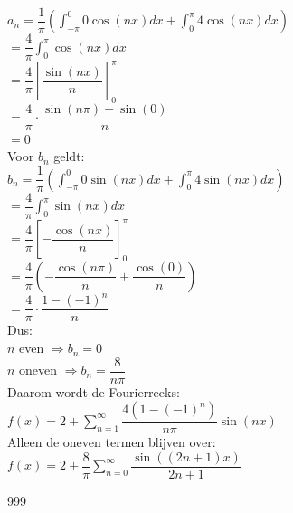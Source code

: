 \documentclass[a4paper]{article}
\newcommand{\dint}{\displaystyle\int}
\begin{document}
$ a_n=\dfrac{1}{\pi}\left(\dint_{-\pi}^{0}0\cos(nx)dx+\dint_{0}^{\pi}4\cos(nx)dx\right) $ \\

$ =\dfrac{4}{\pi}\dint_{0}^{\pi}\cos(nx)dx $ \\

$ =\dfrac{4}{\pi}\left[\dfrac{\sin(nx)}{n}\right]_{0}^{\pi} $ \\

$ =\dfrac{4}{\pi}\cdot\dfrac{\sin(n\pi)-\sin(0)}{n} $ \\

$ =0 $ \\

Voor $b_n$ geldt: \\

$ b_n=\dfrac{1}{\pi}\left(\dint_{-\pi}^{0}0\sin(nx)dx+\dint_{0}^{\pi}4\sin(nx)dx\right) $ \\

$ =\dfrac{4}{\pi}\dint_{0}^{\pi}\sin(nx)dx $ \\

$ =\dfrac{4}{\pi}\left[-\dfrac{\cos(nx)}{n}\right]_{0}^{\pi} $ \\

$ =\dfrac{4}{\pi}\left(-\dfrac{\cos(n\pi)}{n}+\dfrac{\cos(0)}{n}\right) $ \\

$ =\dfrac{4}{\pi}\cdot\dfrac{1-(-1)^n}{n} $ \\

Dus: \\

$ n $ even $ \Rightarrow b_n=0 $ \\

$ n $ oneven $ \Rightarrow b_n=\dfrac{8}{n\pi} $ \\

Daarom wordt de Fourierreeks: \\

$ f(x)=2+\displaystyle\sum_{n=1}^{\infty}\dfrac{4(1-(-1)^n)}{n\pi}\sin(nx) $ \\

Alleen de oneven termen blijven over: \\

$ f(x)=2+\dfrac{8}{\pi}\displaystyle\sum_{n=0}^{\infty}\dfrac{\sin((2n+1)x)}{2n+1} $ \\

\begin{thebibliography}{999}
\end{thebibliography}
\end{document}
